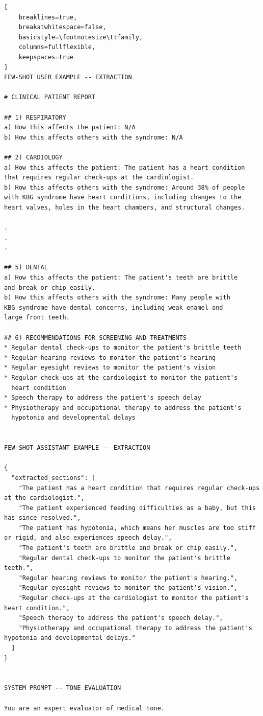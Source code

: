 \documentclass[ %
                    author={Aman Kumar Singh},
                supervisor={Dr. Edwin Simpson},
                    degree={MSc},
                     title={Quality-Aware Knowledge Distillation of Large Language Models for Efficient Personalised Clinical Report Generation},
                  subtitle={},
                      type={},
                      year={2021}]{dissertation}
\begin{document}
\begin{lstlisting}[
    breaklines=true,
    breakatwhitespace=false,
    basicstyle=\footnotesize\ttfamily,
    columns=fullflexible,
    keepspaces=true
]
FEW-SHOT USER EXAMPLE -- EXTRACTION

# CLINICAL PATIENT REPORT

## 1) RESPIRATORY
a) How this affects the patient: N/A
b) How this affects others with the syndrome: N/A

## 2) CARDIOLOGY
a) How this affects the patient: The patient has a heart condition
that requires regular check-ups at the cardiologist.
b) How this affects others with the syndrome: Around 38% of people
with KBG syndrome have heart conditions, including changes to the
heart valves, holes in the heart chambers, and structural changes.

.
.
.

## 5) DENTAL
a) How this affects the patient: The patient's teeth are brittle
and break or chip easily.
b) How this affects others with the syndrome: Many people with
KBG syndrome have dental concerns, including weak enamel and
large front teeth.

## 6) RECOMMENDATIONS FOR SCREENING AND TREATMENTS
* Regular dental check-ups to monitor the patient's brittle teeth
* Regular hearing reviews to monitor the patient's hearing
* Regular eyesight reviews to monitor the patient's vision
* Regular check-ups at the cardiologist to monitor the patient's
  heart condition
* Speech therapy to address the patient's speech delay
* Physiotherapy and occupational therapy to address the patient's
  hypotonia and developmental delays


FEW-SHOT ASSISTANT EXAMPLE -- EXTRACTION

{
  "extracted_sections": [
    "The patient has a heart condition that requires regular check-ups at the cardiologist.",
    "The patient experienced feeding difficulties as a baby, but this has since resolved.",
    "The patient has hypotonia, which means her muscles are too stiff or rigid, and also experiences speech delay.",
    "The patient's teeth are brittle and break or chip easily.",
    "Regular dental check-ups to monitor the patient's brittle teeth.",
    "Regular hearing reviews to monitor the patient's hearing.",
    "Regular eyesight reviews to monitor the patient's vision.",
    "Regular check-ups at the cardiologist to monitor the patient's heart condition.",
    "Speech therapy to address the patient's speech delay.",
    "Physiotherapy and occupational therapy to address the patient's hypotonia and developmental delays."
  ]
}


SYSTEM PROMPT -- TONE EVALUATION

You are an expert evaluator of medical tone.


\end{lstlisting}
\end{document}

